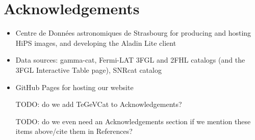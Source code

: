 \section{Acknowledgements}

\begin{itemize}

\item Centre de Donn\'{e}es astronomiques de Strasbourg for producing and hosting HiPS images, and developing the Aladin Lite client
\item Data sources: gamma-cat, Fermi-LAT 3FGL and 2FHL catalogs (and the 3FGL Interactive Table page), SNRcat catalog
\item GitHub Pages for hosting our website


TODO: do we add TeGeVCat to Acknowledgements?


TODO: do we even need an Acknowledgements section if we mention these items above/cite them in References?

\end{itemize}
